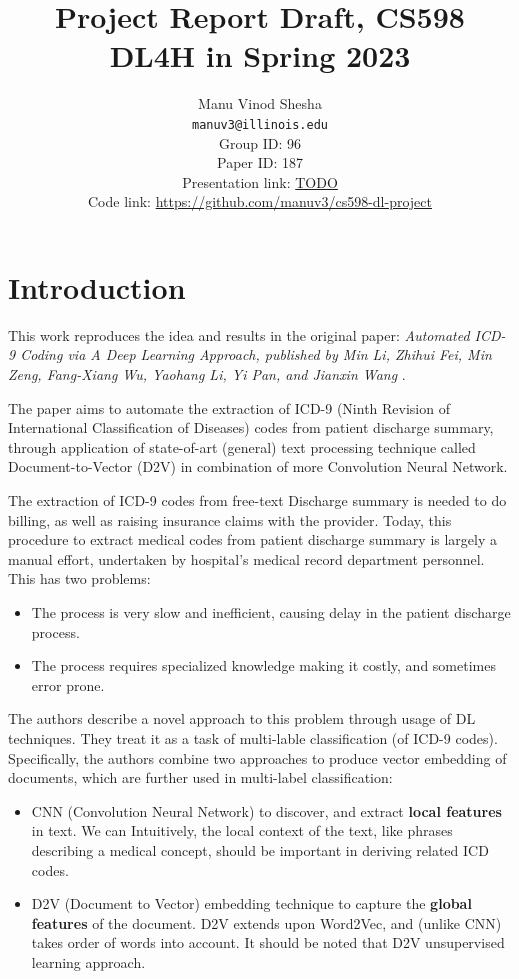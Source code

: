 \documentclass[11pt,a4paper]{article}
\title{Project Report Draft, CS598 DL4H in Spring 2023}
\author{Manu Vinod Shesha \\
  \texttt{manuv3@illinois.edu}
  \\[2em]
  Group ID: 96\\
  Paper ID: 187\\
  Presentation link: \url{TODO} \\
  Code link: \url{https://github.com/manuv3/cs598-dl-project}}
\begin{document}
\maketitle


\section{Introduction}

This work reproduces the idea and results in the original paper: \textit{Automated ICD-9 Coding via A Deep Learning Approach, published by Min Li, Zhihui Fei, Min Zeng, Fang-Xiang Wu, Yaohang Li, Yi Pan, and Jianxin Wang} \cite{8320340}.

The paper aims to automate the extraction of ICD-9 (Ninth Revision of International Classification of Diseases) codes from patient discharge summary, through application of state-of-art (general) text processing technique called Document-to-Vector (D2V) in combination of more Convolution Neural Network.

The extraction of ICD-9 codes from free-text Discharge summary is needed to do billing, as well as raising insurance claims with the provider. Today, this procedure to extract medical codes from patient discharge summary is largely a manual effort, undertaken by hospital’s medical record department personnel. This has two problems:
\begin{itemize}
    \item The process is very slow and inefficient, causing delay in the patient discharge process.
    \item The process requires specialized knowledge making it costly, and sometimes error prone.
\end{itemize}

The authors describe a novel approach to this problem through usage of DL techniques. They treat it as a task of multi-lable classification (of ICD-9 codes). Specifically, the authors combine two approaches to produce vector embedding of documents, which are further used in multi-label classification:
\begin{itemize}
    \item CNN (Convolution Neural Network) to discover, and extract \textbf{local features} in text. We can Intuitively, the local context of the text, like phrases describing a medical concept, should be important in deriving related ICD codes.
    \item D2V (Document to Vector) \cite{le2014distributed} embedding technique to capture the \textbf{global features} of the document. D2V extends upon Word2Vec, and (unlike CNN) takes order of words into account. It should be noted that D2V unsupervised learning approach.
\end{itemize}
\end{document}
